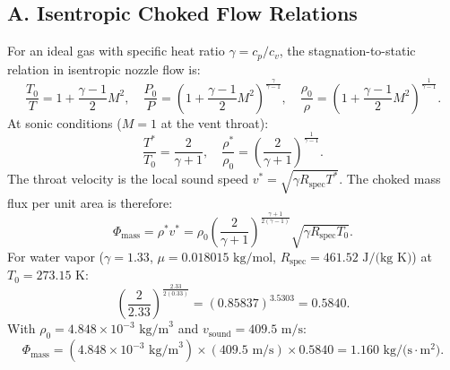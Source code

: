 \documentclass[11pt,a4paper]{article}
\begin{document}
\subsection*{A. Isentropic Choked Flow Relations}
For an ideal gas with specific heat ratio $\gamma = c_p / c_v$, the stagnation-to-static relation in isentropic nozzle flow is:
\begin{equation}
\frac{T_0}{T} = 1 + \frac{\gamma - 1}{2} M^2, \quad \frac{P_0}{P} = \left( 1 + \frac{\gamma - 1}{2} M^2 \right)^{\frac{\gamma}{\gamma - 1}}, \quad \frac{\rho_0}{\rho} = \left( 1 + \frac{\gamma - 1}{2} M^2 \right)^{\frac{1}{\gamma - 1}}.
\end{equation}
At sonic conditions ($M = 1$ at the vent throat):
\begin{equation}
\frac{T^*}{T_0} = \frac{2}{\gamma + 1}, \quad \frac{\rho^*}{\rho_0} = \left( \frac{2}{\gamma + 1} \right)^{\frac{1}{\gamma - 1}}.
\end{equation}
The throat velocity is the local sound speed $v^* = \sqrt{\gamma R_{\mathrm{spec}} T^*}$. The choked mass flux per unit area is therefore:
\begin{equation}
\Phi_{\mathrm{mass}} = \rho^* v^* = \rho_0 \left( \frac{2}{\gamma + 1} \right)^{\frac{\gamma + 1}{2(\gamma - 1)}} \sqrt{\gamma R_{\mathrm{spec}} T_0}.
\end{equation}
For water vapor ($\gamma = 1.33$, $\mu = 0.018015\text{ kg/mol}$, $R_{\mathrm{spec}} = 461.52\text{ J/(kg K)}$) at $T_0 = 273.15\text{ K}$:
\begin{equation}
\left( \frac{2}{2.33} \right)^{\frac{2.33}{2(0.33)}} = (0.85837)^{3.5303} = 0.5840.
\end{equation}
With $\rho_0 = 4.848 \times 10^{-3}\text{ kg/m}^3$ and $v_{\mathrm{sound}} = 409.5\text{ m/s}$:
\begin{equation}
\Phi_{\mathrm{mass}} = (4.848 \times 10^{-3}\text{ kg/m}^3) \times (409.5\text{ m/s}) \times 0.5840 = 1.160\text{ kg/(s}\cdot\text{m}^2).
\end{equation}
\end{document}
